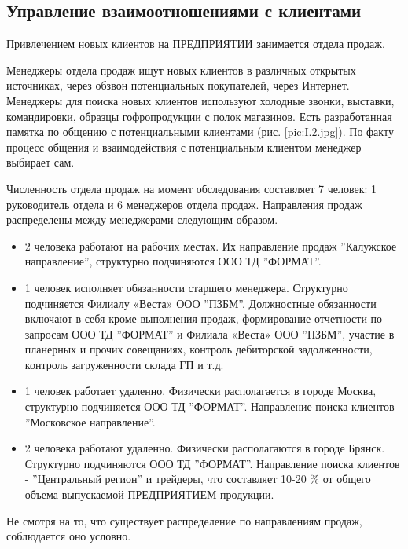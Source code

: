 %
\newpage

\subsection{Управление взаимоотношениями с клиентами}
\label{BP_CRM}

Привлечением новых клиентов на ПРЕДПРИЯТИИ занимается отдела продаж.

Менеджеры отдела продаж ищут новых клиентов в различных открытых источниках, через обзвон потенциальных покупателей, через Интернет. 
Менеджеры для поиска новых клиентов используют холодные звонки, выставки, командировки, образцы гофропродукции с полок магазинов. Есть разработанная памятка по общению с потенциальными клиентами (рис. \ref{pic:I.2.jpg}). По факту процесс общения и взаимодействия с потенциальным клиентом менеджер выбирает сам.

Численность отдела продаж на момент обследования составляет 7 человек: 1 руководитель отдела и 6 менеджеров отдела продаж.
Направления продаж распределены между менеджерами следующим образом.

\begin{itemize}
    \item 2 человека работают на рабочих местах. Их направление продаж  ''Калужское направление'', структурно подчиняются ООО ТД ''ФОРМАТ''.
    \item 1 человек исполняет обязанности старшего менеджера. Структурно подчиняется Филиалу «Веста» ООО ''ПЗБМ''. Должностные обязанности включают в себя кроме выполнения продаж, формирование отчетности по запросам ООО ТД ''ФОРМАТ'' и Филиала «Веста» ООО ''ПЗБМ'', участие в планерных и прочих совещаниях, контроль дебиторской задолженности, контроль загруженности склада ГП и т.д.
    \item 1 человек работает удаленно. Физически располагается в городе Москва, структурно подчиняется ООО ТД ''ФОРМАТ''. Направление поиска клиентов - ''Московское направление''.
    \item 2 человека  работают удаленно. Физически располагаются в городе Брянск. Структурно подчиняются ООО ТД ''ФОРМАТ''. Направление поиска клиентов - ''Центральный регион'' и трейдеры, что составляет 10-20 \% от общего объема выпускаемой ПРЕДПРИЯТИЕМ продукции.
    
\end{itemize}


Не смотря на то, что существует распределение по направлениям продаж, соблюдается оно условно.


